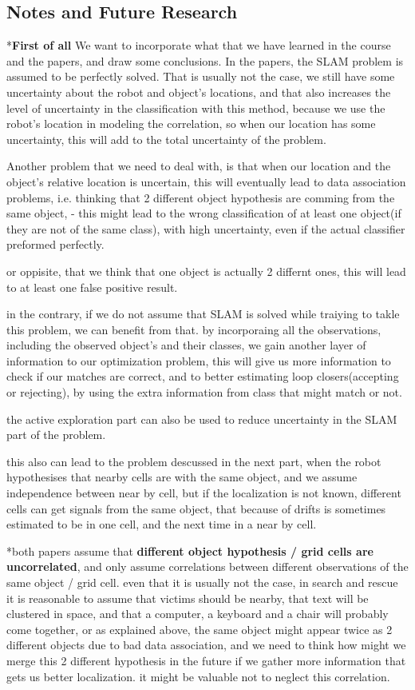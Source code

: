 \documentclass{article}
\begin{document}
	\subsection{Notes and Future Research}
	
	*\textbf{First of all} We want to incorporate what that we have learned in the course and the papers, and draw some conclusions.
	In the papers, the SLAM problem is assumed to be perfectly solved. That is usually not the case, we still have some uncertainty about the robot and object's locations, and that also increases the level of uncertainty in the classification with this method, because we use the robot's location in modeling the correlation, so when our location has some uncertainty, this will add to the total uncertainty of the problem.
	
	Another problem that we need to deal with, is that when our location and the object's relative location is uncertain, this will eventually lead to data association problems, i.e. thinking that 2 different object hypothesis are comming from the same object, - this might lead to the wrong classification of at least one object(if they are not of the same class), with high uncertainty, even if the actual classifier preformed perfectly.
	
	or oppisite, that we think that one object is actually 2 differnt ones, this will lead to at least one false positive result.
	
	in the contrary, if we do not assume that SLAM is solved while traiying to takle this problem, we can benefit from that.
	by incorporaing all the observations, including the observed object's and their classes, we gain another layer of information to our optimization problem, this will give us more information to check if our matches are correct, and to better estimating loop closers(accepting or rejecting), by using the extra information from class that might match or not. 
	
	the active exploration part can also be used to reduce uncertainty in the SLAM part of the problem.
	
	this also can lead to the problem descussed in the next part, when the robot hypothesises that nearby cells are with the same object, and we assume independence between near by cell, but if the localization is not known, different cells can get signals from the same object, that because of drifts is sometimes estimated to be in one cell, and the next time in a near by cell.
	
	*both papers assume that \textbf{different object hypothesis / grid cells are uncorrelated}, and only assume correlations between different observations of the same object / grid cell. even that it is usually not the case, in search and rescue it is reasonable to assume that victims should be nearby, that text will be clustered in space, and that a computer, a keyboard and a chair will probably come together, or as explained above, the same object might appear twice as 2 different objects due to bad data association, and we need to think how might we merge this 2 different hypothesis in the future if we gather more information that gets us better localization. it might be valuable not to neglect this correlation.
	
\end{document}
